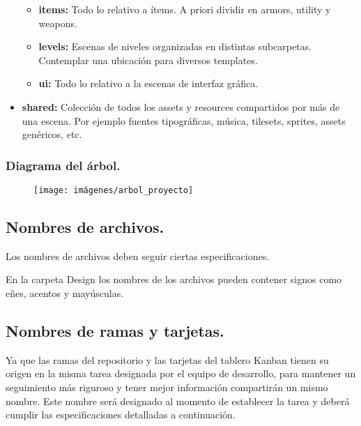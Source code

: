 \begin{itemize}
\begin{itemize}
	\item \textbf{items:} Todo lo relativo a ítems. A priori dividir en armors, utility y weapons.

	\item \textbf{levels:} Escenas de niveles organizadas en distintas subcarpetas. Contemplar una ubicación para diversos templates.

	\item \textbf{ui:} Todo lo relativo a la escenas de interfaz gráfica.
\end{itemize}

\item \textbf{shared:} Colección de todos los assets y resources compartidos por más de una escena. Por ejemplo fuentes tipográficas, música, tilesets, sprites, assets genéricos, etc.
\end{itemize}

\subsubsection*{Diagrama del árbol.}
\begin{figure}[H]
\centering
\texttt{[image: imágenes/arbol\_proyecto]}
\label{fig:arbolproyecto}
\end{figure}









\subsection{Nombres de archivos.}\label{organizacion:nombres-de-archivos}
Los nombres de archivos deben seguir ciertas especificaciones.

En la carpeta Design los nombres de los archivos pueden contener signos como eñes, acentos y mayúsculas.

\subsection{Nombres de ramas y tarjetas.}\label{organizacion:nombres-de-ramas}
Ya que las ramas del repositorio  y las tarjetas del tablero Kanban tienen su origen en la misma tarea designada por el equipo de desarrollo, para mantener un seguimiento más riguroso y tener mejor información compartirán un mismo nombre. Este nombre será designado al momento de establecer la tarea y deberá cumplir las especificaciones detalladas a continuación.


